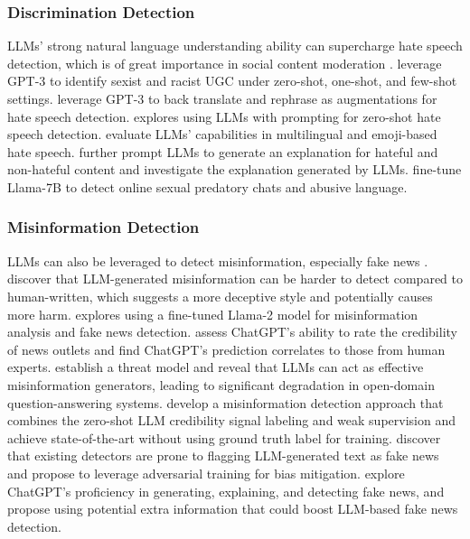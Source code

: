\documentclass[11pt]{article}
\begin{document}
\subsubsection{Discrimination Detection}
\label{sec:hatespeech}
LLMs' strong natural language understanding ability can supercharge hate speech detection, which is of great importance in social content moderation \cite{matwin2021survey}. \citet{chiu2021detecting} leverage GPT-3 to identify sexist and racist UGC under zero-shot, one-shot, and few-shot settings. \citet{cohen2023enhancing} leverage GPT-3 to back translate and rephrase as augmentations for hate speech detection. 
\citet{del2023respectful} explores using LLMs with prompting for zero-shot hate speech detection. \citet{das2023evaluating} evaluate LLMs' capabilities in multilingual and emoji-based hate speech. \citet{wang2023evaluating} further prompt LLMs to generate an explanation for hateful and non-hateful content and investigate the explanation generated by LLMs. \citet{nguyen2023fine} fine-tune Llama-7B to detect online sexual predatory chats and abusive language.


\subsubsection{Misinformation Detection}
\label{sec:misinfo}
LLMs can also be leveraged to detect misinformation, especially fake news \cite{jiang2023disinformation}. \citet{chen2023can} discover that LLM-generated misinformation can be harder to detect compared to human-written, which suggests a more deceptive style and potentially causes more harm. \citet{pavlyshenko2023analysis} explores using a fine-tuned Llama-2 model for misinformation analysis and fake news detection. \citet{yang2023large} assess ChatGPT's ability to rate the credibility of news outlets and find ChatGPT's prediction correlates to those from human experts. \citet{pan2023risk} establish a threat model and reveal that LLMs can act as effective misinformation generators, leading to significant degradation in open-domain question-answering systems. \citet{leite2023detecting} develop a misinformation detection approach that combines the zero-shot LLM credibility signal labeling and weak supervision and achieve state-of-the-art without using ground truth label for training. \citet{su2023fake} discover that existing detectors are prone to flagging LLM-generated text as fake news and propose to leverage adversarial training for bias mitigation. \citet{huang2023harnessing} explore ChatGPT's proficiency in generating, explaining, and detecting fake news, and propose using potential extra information that could boost LLM-based fake news detection.
\end{document}
